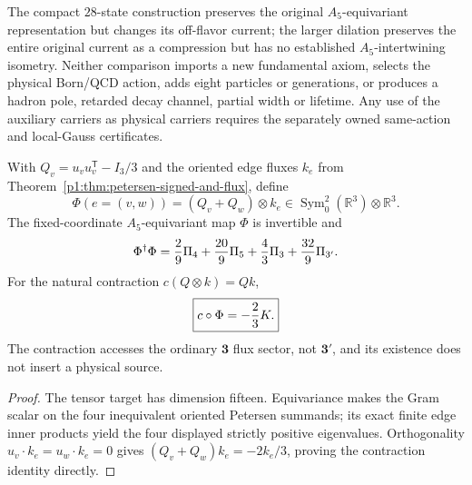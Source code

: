 \documentclass[11pt]{article}
\begin{document}
\begin{remark}
\label{p1b:rem:fullcarrier-geometry-physical-firewall}
The compact $28$-state construction preserves the original
$A_5$-equivariant representation but changes its off-flavor current;
the larger dilation preserves the entire original current as a
compression but has no established $A_5$-intertwining isometry.
Neither comparison imports a new fundamental axiom, selects the
physical Born/QCD action, adds eight particles or generations, or
produces a hadron pole, retarded decay channel, partial width or
lifetime.  Any use of the auxiliary carriers as physical carriers
requires the separately owned same-action and local-Gauss certificates.
\end{remark}


\begin{proposition}
\label{p1:prop:v371-petersen-quadrupole-flux}
With $Q_v=u_vu_v^{\mathsf T}-I_3/3$ and the oriented edge fluxes
$k_e$ from Theorem~\ref{p1:thm:petersen-signed-and-flux}, define
\[
 \Phi(e=(v,w))=(Q_v+Q_w)\otimes k_e
 \in\operatorname{Sym}^2_0(\mathbb R^3)\otimes\mathbb R^3.
\]
The fixed-coordinate $A_5$-equivariant map $\Phi$ is invertible and
\[
 \Phi^\dagger\Phi={2\over9}\Pi_4
 +{20\over9}\Pi_5+{4\over3}\Pi_3+{32\over9}\Pi_{3'}.
\]
For the natural contraction $c(Q\otimes k)=Qk$,
\[
 \boxed{c\circ\Phi=-{2\over3}K.}
\]
The contraction accesses the ordinary $\mathbf3$ flux sector, not
$\mathbf3'$, and its existence does not insert a physical source.
\end{proposition}
\begin{proof}
The tensor target has dimension fifteen. Equivariance makes the
Gram scalar on the four inequivalent oriented Petersen summands;
its exact finite edge inner products yield the four displayed
strictly positive eigenvalues. Orthogonality
$u_v\cdot k_e=u_w\cdot k_e=0$ gives
$(Q_v+Q_w)k_e=-2k_e/3$, proving the contraction identity directly.
\end{proof}
\end{document}
